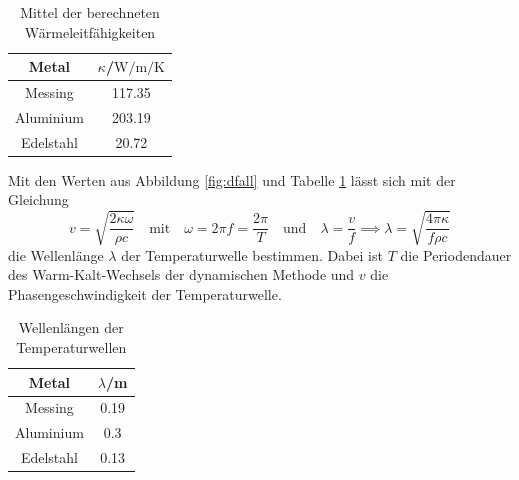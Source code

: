 \begin{table}
  \centering
  \caption{Mittel der berechneten Wärmeleitfähigkeiten}
  \begin{tabular}{c c}
    \toprule
    Metal & $\kappa$/$\si{\watt\per\meter\per\kelvin}$ \\
    \midrule
    Messing & 117.35 \\
    Aluminium & 203.19 \\
    Edelstahl & 20.72 \\
    \bottomrule
  \end{tabular}
  \label{tab:kappa}
\end{table}
\FloatBarrier
Mit den Werten aus Abbildung \ref{fig:dfall} und
Tabelle \ref{tab:kappa} lässt sich mit
der Gleichung
\begin{equation*}
  v = \sqrt{\frac{2\kappa \omega}{\rho c }} \quad \text{mit} \quad
  \omega = 2\pi f = \frac{2\pi}{T}
  \quad \text{und} \quad
  \lambda = \frac{v}{f}
  \implies \lambda = \sqrt{\frac{4\pi\kappa}{f \rho c}}
\end{equation*}
die Wellenlänge $ \lambda $ der Temperaturwelle bestimmen. Dabei ist
$T$ die Periodendauer des Warm-Kalt-Wechsels der dynamischen Methode und
$v$ die Phasengeschwindigkeit der Temperaturwelle.
\begin{table}
  \centering
  \caption{Wellenlängen der Temperaturwellen}
  \begin{tabular}{cc}
    \toprule
    Metal & $\lambda$/\si{\meter} \\
    \midrule
    Messing & 0.19 \\
    Aluminium & 0.3 \\
    Edelstahl & 0.13 \\
    \bottomrule
  \end{tabular}
  \label{tab:lam}
\end{table}





























%
